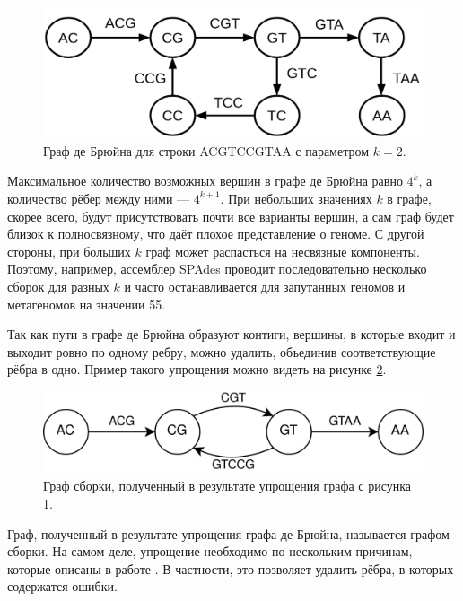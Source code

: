 \documentclass[14pt]{matmex-diploma-custom}
\begin{document}
\begin{figure}[h]
	\centering
	\includegraphics[scale=0.3]{debruijn.png}
	\caption{Граф де Брюйна для строки ACGTCCGTAA с параметром ${k=2}$.}
	\label{fig:debruijn}
\end{figure}

Максимальное количество возможных вершин в графе де Брюйна равно $4^k$, а количество рёбер между ними --- $4^{k+1}$. При небольших значениях $k$ в графе, скорее всего, будут присутствовать почти все варианты вершин, а сам граф будет близок к полносвязному, что даёт плохое представление о геноме. С другой стороны, при больших $k$ граф может распасться на несвязные компоненты. Поэтому, например, ассемблер SPAdes проводит последовательно несколько сборок для разных $k$ и часто останавливается для запутанных геномов и метагеномов на значении 55.

Так как пути в графе де Брюйна образуют контиги, вершины, в которые входит и выходит ровно по одному ребру, можно удалить, объединив соответствующие рёбра в одно. Пример такого упрощения можно видеть на рисунке \ref{fig:debruijn_simpl}.

\begin{figure}[h]
	\centering
	\includegraphics[scale=0.22]{debruijn_simpl.png}
	\caption{Граф сборки, полученный в результате упрощения графа с рисунка \ref{fig:debruijn}.}
	\label{fig:debruijn_simpl}
\end{figure}

Граф, полученный в результате упрощения графа де Брюйна, называется графом сборки. На самом деле, упрощение необходимо по нескольким причинам, которые описаны в работе \cite{art:disser_andrey}. В частности, это позволяет удалить рёбра, в которых содержатся ошибки.
\end{document}
